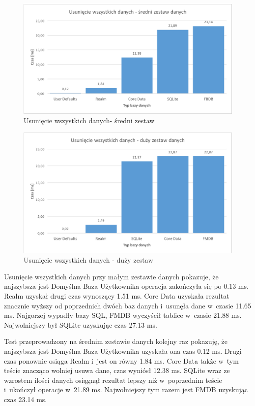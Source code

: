 \begin{figure}[H]
\centering
	\includegraphics[width=15cm]{img/delete_data/delete_all/delete_all_medium_test.png}
	\caption{Usunięcie wszystkich danych- średni zestaw}
	\label{fig: delete-all-medium}
\end{figure}

\begin{figure}[H]
\centering
	\includegraphics[width=15cm]{img/delete_data/delete_all/delete_all_big_test.png}
	\caption{Usunięcie wszystkich danych - duży zestaw}
	\label{fig: delete-all-big}
\end{figure}

Usunięcie wszystkich danych przy małym zestawie danych pokazuje, że najszybsza jest Domyślna Baza Użytkownika operacja zakończyła się po 0.13 ms. Realm uzyskał drugi czas wynoszący 1.51 ms. Core Data uzyskała rezultat znacznie wyższy od poprzednich dwóch baz danych i~usunęła dane w~czasie 11.65 ms. Najgorzej wypadły bazy SQL, FMDB wyczyścił tablice w~czasie 21.88 ms. Najwolniejszy był SQLite uzyskując czas 27.13 ms. 

Test przeprowadzony na średnim zestawie danych kolejny raz pokazuję, że najszybsza jest Domyślna Baza Użytkownika uzyskała ona czas 0.12 ms. Drugi czas ponownie osiąga Realm i~jest on równy 1.84 ms. Core Data także w~tym teście znacząco wolniej usuwa dane, czas wyniósł 12.38 ms. SQLite wraz ze wzrostem ilości danych osiągnął rezultat lepszy niż w~poprzednim teście i~ukończył operacje w~21.89 ms. Najwolniejszy tym razem jest FMDB uzyskując czas 23.14 ms. 

